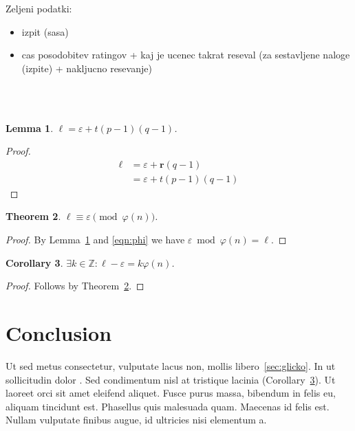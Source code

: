 \documentclass{IEEEtran}
\newcommand{\B}[1]{\ensuremath{\boldsymbol{#1}}}
\newcommand{\bi}[1]{\boldmath{\ensuremath{#1}}}
\newcommand{\Z}{\ensuremath{\mathbb Z}}
\newtheorem{theorem}{Theorem}[section]
\newtheorem{corollary}[theorem]{Corollary}
\newtheorem{lemma}[theorem]{Lemma}
\begin{document}
Zeljeni podatki:
\begin{itemize}
    \item izpit (sasa)
    \item cas posodobitev ratingov + kaj je ucenec takrat reseval (za sestavljene naloge (izpite) + nakljucno resevanje)
\end{itemize}
\hfill
\\
\\
\begin{lemma} \label{lem:eps}
$\ell = \varepsilon + t(p-1)(q-1)$.
\end{lemma}

\begin{proof}
\begin{align*}
\ell &= \varepsilon + \B{r}(q-1) \\
&= \varepsilon + t(p-1)(q-1)
\end{align*}
\end{proof}

\begin{theorem} \label{thm:equiv}
$\ell \equiv \varepsilon \pmod{\varphi(n)}$.
\end{theorem}

\begin{proof}
By Lemma~\ref{lem:eps} and \eqref{eqn:phi} we have $\varepsilon \bmod{\varphi(n)} = \ell$.
\end{proof}

\begin{corollary} \label{cor:mult}
$\exists k \in \Z: \ell - \varepsilon = k \varphi(n)$.
\end{corollary}

\begin{proof}
Follows by Theorem~\ref{thm:equiv}.
\end{proof}

\section{Conclusion}
\label{sec:cnc}
Ut sed metus consectetur, vulputate lacus non, mollis libero~\ref{sec:glicko}.
In ut sollicitudin dolor \bi{n = pq}.
Sed condimentum nisl at tristique lacinia (Corollary~\ref{cor:mult}).
Ut laoreet orci sit amet eleifend aliquet.
Fusce purus massa, bibendum in felis eu, aliquam tincidunt est.
Phasellus quis malesuada quam.
Maecenas id felis est.
Nullam vulputate finibus augue, id ultricies nisi elementum a.



\end{document}
